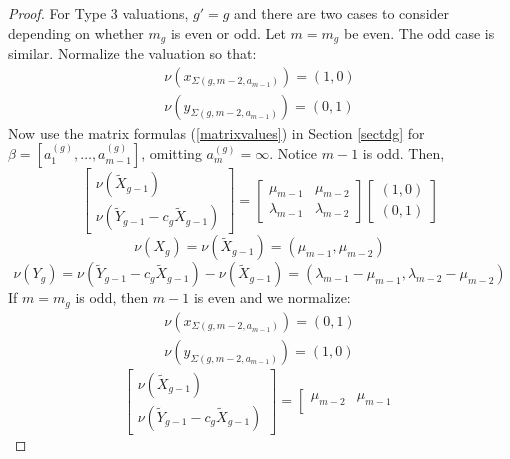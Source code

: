 \documentclass[11pt]{amsart}
\theoremstyle{definition}
\begin{document}
{\begin{proof}
For Type 3 valuations, $g'=g$ and there are two cases to consider depending on whether $m_g$ is even or odd. Let $m=m_g$ be even. The odd case is similar. Normalize the valuation so that:
\begin{equation*}
\begin{array}{l}
\nu(x_{\Sigma(g,m-2,a_{m-1})})=(1,0) \\
\nu(y_{\Sigma(g,m-2,a_{m-1})})=(0,1)
\end{array}
\end{equation*}
Now use the matrix formulas (\ref{matrixvalues}) in Section \ref{sectdg} for $\beta=[a_1^{(g)},\ldots, a_{m-1}^{(g)}]$, omitting $a_m^{(g)}=\infty$. Notice $m-1$ is odd. Then,
\begin{equation*}
\left[
\begin{array}{c}
\nu(\tilde X_{g-1}) \\
\nu(\tilde Y_{g-1}-c_g\tilde X_{g-1})
\end{array}
\right]
=
\left[
\begin{array}{ll}
\mu_{m-1} & \mu_{m-2} \\
\lambda_{m-1} & \lambda_{m-2}
\end{array}
\right]
\left[
\begin{array}{c}
(1,0) \\
(0,1)
\end{array}
\right]
\end{equation*}
\begin{equation*}
\nu(X_g)=\nu(\tilde X_{g-1}) = (\mu_{m-1},\mu_{m-2})
\end{equation*}
\begin{equation*}
\nu(Y_g)=\nu(\tilde Y_{g-1}-c_g\tilde X_{g-1})-\nu(\tilde X_{g-1}) = (\lambda_{m-1}-\mu_{m-1},\lambda_{m-2}-\mu_{m-2})
\end{equation*}
If $m=m_g$ is odd, then $m-1$ is even and we normalize:
\begin{equation*}
\begin{array}{l}
\nu(x_{\Sigma(g,m-2,a_{m-1})})=(0,1) \\
\nu(y_{\Sigma(g,m-2,a_{m-1})})=(1,0)
\end{array}
\end{equation*}
\begin{equation*}
\left[
\begin{array}{c}
\nu(\tilde X_{g-1}) \\
\nu(\tilde Y_{g-1}-c_g\tilde X_{g-1})
\end{array}
\right]
=
\left[
\begin{array}{ll}
\mu_{m-2} & \mu_{m-1} \\

\end{array}
\end{equation*}
\end{proof}}
\end{document}
